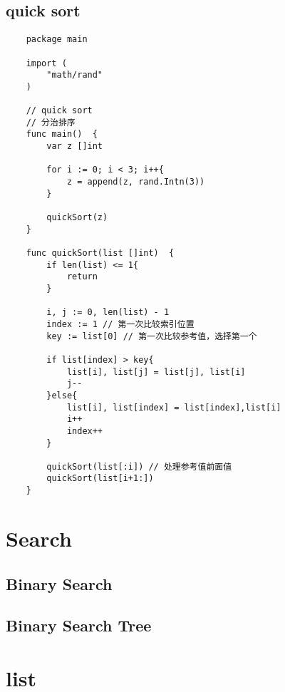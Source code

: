 \documentclass[oneside,12pt,twiside,a4paper]{ctexbook}
\begin{document}
\section{quick sort}
\begin{lstlisting}
    package main

    import (
        "math/rand"
    )
    
    // quick sort
    // 分治排序
    func main()  {
        var z []int
    
        for i := 0; i < 3; i++{
            z = append(z, rand.Intn(3))
        }
        
        quickSort(z)	
    }
    
    func quickSort(list []int)  {
        if len(list) <= 1{
            return
        }
    
        i, j := 0, len(list) - 1
        index := 1 // 第一次比较索引位置
        key := list[0] // 第一次比较参考值，选择第一个
    
        if list[index] > key{
            list[i], list[j] = list[j], list[i]
            j--
        }else{
            list[i], list[index] = list[index],list[i]
            i++
            index++
        }
    
        quickSort(list[:i]) // 处理参考值前面值
        quickSort(list[i+1:])
    }
\end{lstlisting}

%
\chapter{Search}
\section{Binary Search}
\section{Binary Search Tree}

%
\chapter{list}
\end{document}
